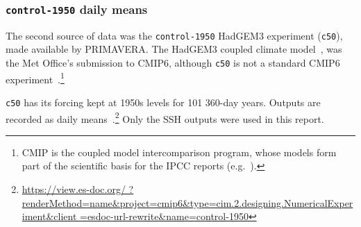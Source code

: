 \subsubsection{\texttt{control-1950} daily means}

\label{sec:control-1950-intro}

The second source of data was the \texttt{control-1950} HadGEM3 experiment (\texttt{c50}),
made available by PRIMAVERA.
The HadGEM3 coupled climate model~\cite{williams2018met, FurtherInfo},
 was the Met Office's submission to CMIP6,
although \texttt{c50} is not a standard CMIP6 experiment~\cite{eyring2016overview}.\footnote{
CMIP is the coupled model intercomparison program,
whose models form part of the scientific basis for the IPCC
reports (e.g.~\cite{SROCC}).}

\texttt{c50} has its forcing kept at
1950s levels for 101 360-day years. Outputs are recorded as daily
means~\cite{williams2018met, FurtherInfo}.\footnote{\url{https://view.es-doc.org/
        ?renderMethod=name&project=cmip6&type=cim.2.designing.NumericalExperiment&client
        =esdoc-url-rewrite&name=control-1950}}
Only the SSH outputs were used in this report.
